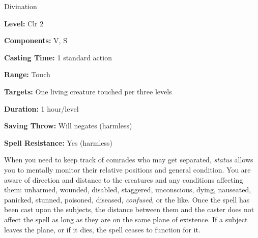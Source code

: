 
Divination

\textbf{Level:} Clr 2

\textbf{Components:} V, S

\textbf{Casting Time:} 1 standard action

\textbf{Range:} Touch

\textbf{Targets:} One living creature touched per three levels

\textbf{Duration:} 1 hour/level

\textbf{Saving Throw:} Will negates (harmless)

\textbf{Spell Resistance:} Yes (harmless)

When you need to keep track of comrades who may get separated, \textit{status} allows 
you to mentally monitor their relative positions and general condition. You are 
aware of direction and distance to the creatures and any conditions affecting them: 
unharmed, wounded, disabled, staggered, unconscious, dying, nauseated, panicked, 
stunned, poisoned, diseased, \textit{confused}, or the like. Once the spell has 
been cast upon the subjects, the distance between them and the caster does not 
affect the spell as long as they are on the same plane of existence. If a subject 
leaves the plane, or if it dies, the spell ceases to function for it.

